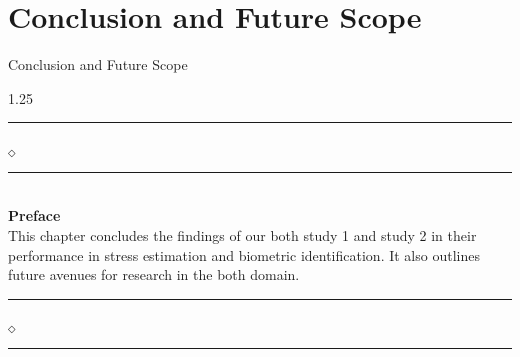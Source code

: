 








\chapter[Conclusion and Future Scope]{Conclusion and Future Scope}{Conclusion and Future Scope}\label{Conclusion and Future Scope}
\begin{spacing}{1.25}
\vskip 20pt
\noindent
\rule{0.49\textwidth}{0.75pt} $_{\Diamond}$ \rule{0.49\textwidth}{0.75pt}\\
{\Large{\textbf{Preface}}}\\
This chapter concludes the findings of our both study 1 and study 2 in their performance in stress estimation and biometric identification. It also outlines future avenues for research in the both domain.\\
\rule{0.49\textwidth}{0.75pt} $_{\Diamond}$ \rule{0.49\textwidth}{0.75pt}
\end{spacing}
\newpage







